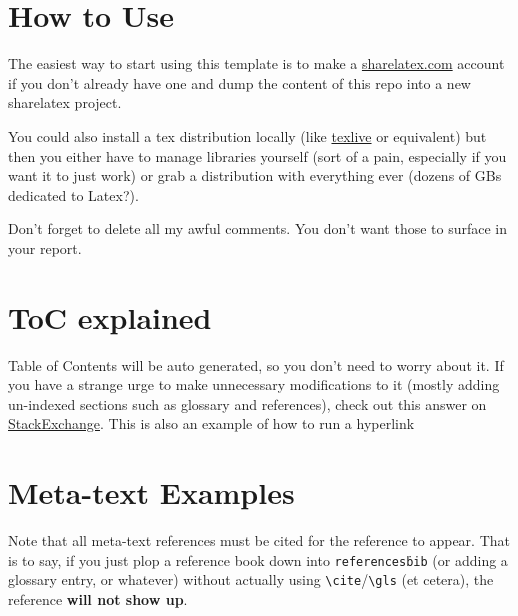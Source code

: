 \documentclass[12pt]{article}
\begin{document}
	\listoffigures
	
	
	\listoftables

	
	
	
	\section{How to Use}
    The easiest way to start using this template is to make a \href{https://www.sharelatex.com}{sharelatex.com} account if you don't already have one and dump the content of this repo into a new sharelatex project.

    You could also install a tex distribution locally (like \href{https://www.tug.org/texlive/}{texlive} or equivalent) but then you either have to manage libraries yourself (sort of a pain, especially if you want it to just work) or grab a distribution with everything ever (dozens of GBs dedicated to Latex?).
    
    Don't forget to delete all my awful comments. You don't want those to surface in your report.

	\section{ToC explained}
	
	Table of Contents will be auto generated, so you don't need to worry about it. If you have a strange urge to make unnecessary modifications to it (mostly adding un-indexed sections such as glossary and references), check out this answer on
    \href{https://tex.stackexchange.com/questions/119719/add-an-item-in-the-table-of-contents}{StackExchange}. This is also an example of how to run a hyperlink
    
	\section{Meta-text Examples}
    Note that all meta-text references must be cited for the reference to appear. That is to say, if you just plop a reference book down into \texttt{references\.bib} (or adding a glossary entry, or whatever) without actually using \texttt{\textbackslash cite}/\texttt{\textbackslash gls} (et cetera), the reference \textbf{will not show up}.
    
\end{document}

